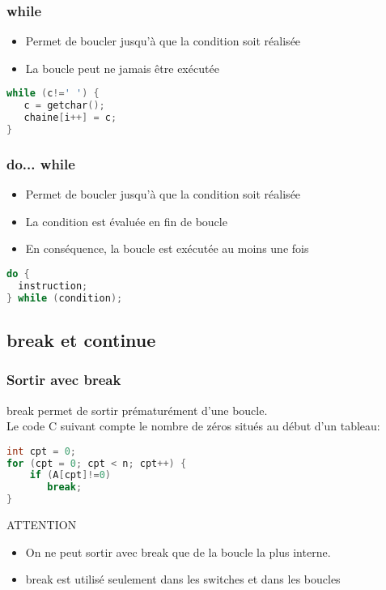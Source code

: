 \documentclass{beamer}
\begin{document}
\begin{frame}[fragile=singleslide,shrink=20]
\frametitle {while}
\begin{itemize}
\item{Permet de boucler jusqu'à que la condition soit réalisée}
\item{La boucle peut ne jamais être exécutée}
\end{itemize}
\begin{lstlisting}[language=c++]
while (c!=' ') {
   c = getchar();
   chaine[i++] = c;
}
\end{lstlisting}
\end{frame}

\begin{frame}[fragile=singleslide,shrink=20]
\frametitle {do... while}
\begin{itemize}
\item{Permet de boucler jusqu'à que la condition soit réalisée}
\item{La condition est évaluée en fin de boucle}
\item{En conséquence, la boucle est exécutée au moins une fois}
\end{itemize}
\begin{lstlisting}[language=c++]
do {
  instruction;
} while (condition);
\end{lstlisting}
\end{frame}

\subsection{break et continue}

\begin{frame}[fragile=singleslide,shrink=20]
\frametitle {Sortir avec break}
break permet de sortir prématurément d'une boucle. \\
Le code C suivant compte le nombre de zéros situés au début d'un tableau:
\begin{lstlisting}[language=c++]
int cpt = 0;
for (cpt = 0; cpt < n; cpt++) {
    if (A[cpt]!=0)
       break;
}
\end{lstlisting}

\begin{block}{ATTENTION}
\begin{itemize}
\item{On ne peut sortir avec break que de la boucle la plus interne.}
\item{break est utilisé seulement dans les switches et dans les boucles}
\end{itemize}
\end{block}
\end{frame}
\end{document}
